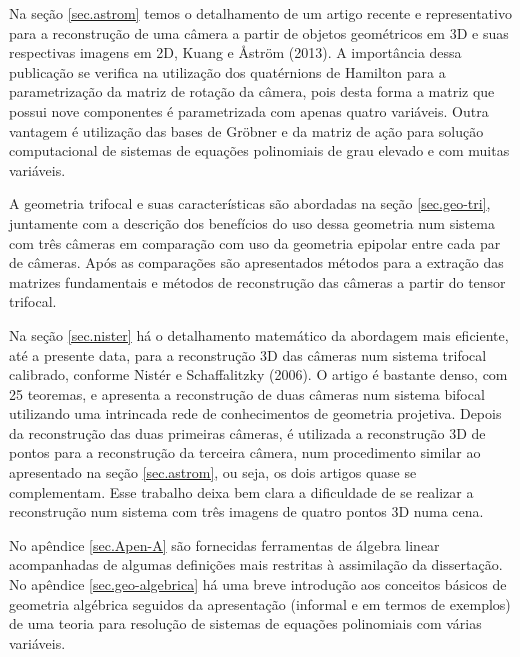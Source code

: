 Na seção \ref{sec.astrom} temos o detalhamento de um artigo recente e representativo para a reconstrução de uma câmera a partir de objetos geométricos em 3D e suas respectivas imagens em 2D, Kuang e \AA str\"om (2013). A importância dessa publicação se verifica na utilização dos quatérnions de Hamilton para a parametrização da matriz de rotação da câmera, pois desta forma a matriz que possui nove componentes é parametrizada com apenas quatro variáveis. Outra vantagem é utilização das bases de Gr\"obner e da matriz de ação para solução computacional de sistemas de equações polinomiais de grau elevado e com muitas variáveis.

A geometria trifocal e suas características são abordadas na seção \ref{sec.geo-tri}, juntamente com a descrição dos benefícios do uso dessa geometria num sistema com três câmeras em comparação com uso da geometria epipolar entre cada par de câmeras. Após as comparações são apresentados métodos para a extração das matrizes fundamentais e métodos de reconstrução das câmeras a partir do tensor trifocal.  

Na seção \ref{sec.nister} há o detalhamento matemático da abordagem mais eficiente, até a presente data, para a reconstrução 3D das câmeras num sistema trifocal calibrado, conforme Nist\' er e Schaffalitzky (2006). O artigo é bastante denso, com 25 teoremas, e apresenta a reconstrução de duas câmeras num sistema bifocal utilizando uma intrincada rede de conhecimentos de geometria projetiva. Depois da reconstrução das duas primeiras câmeras, é utilizada a reconstrução 3D de pontos para a reconstrução da terceira câmera, num procedimento similar ao apresentado na seção \ref{sec.astrom}, ou seja, os dois artigos quase se complementam. Esse trabalho deixa bem clara a dificuldade de se realizar a reconstrução num sistema com três imagens de quatro pontos 3D numa cena.

No apêndice \ref{sec.Apen-A} são fornecidas ferramentas de álgebra linear acompanhadas de algumas definições mais restritas à assimilação da dissertação. No apêndice \ref{sec.geo-algebrica} há uma breve introdução aos conceitos básicos de geometria algébrica seguidos da apresentação (informal e em termos de exemplos) de uma teoria para resolução de sistemas de equações polinomiais com várias variáveis.

